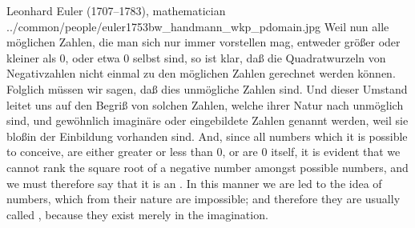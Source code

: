 \newpage
\qboxnpqt
  {
    Leonhard Euler (1707--1783), mathematician
    \footnotemark
  }
  {../common/people/euler1753bw_handmann_wkp_pdomain.jpg}
  {Weil nun alle m\"oglichen Zahlen, die man sich nur immer vorstellen mag,
    entweder gr\"o{\ss}er oder kleiner als 0, oder etwa 0 selbst sind, so ist klar, da{\ss}
    die Quadratwurzeln von Negativzahlen nicht einmal zu den m\"oglichen Zahlen
    gerechnet werden k\"onnen.
    Folglich m\"ussen wir sagen, da{\ss} dies unm\"ogliche Zahlen sind.
    Und dieser Umstand leitet uns auf den Begri{\ss} von solchen Zahlen,
    welche ihrer Natur nach unm\"oglich sind, und gew\"ohnlich imagin\"are
    oder eingebildete Zahlen genannt werden, weil sie blo\ss in der Einbildung
    vorhanden sind.}
  {And, since all numbers which it is possible to conceive,
    are either greater or less than 0, or are 0 itself,
    it is evident that we cannot rank the square root of a negative
    number amongst possible numbers, and we must therefore say that
    it is an .
    In this manner we are led to the idea of numbers,
    which from their nature are impossible;
    and therefore they are usually called ,
    because they exist merely in the imagination.}



